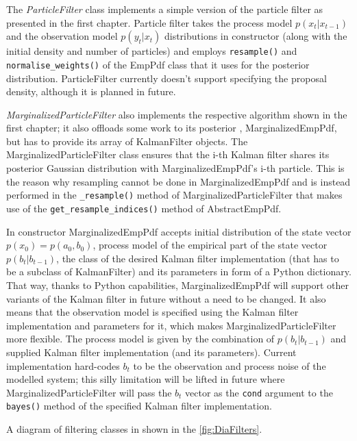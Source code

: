 The \emph{ParticleFilter} class implements a simple version of the particle filter as presented in
the first chapter. Particle filter takes the process model \(p(x_t|x_{t-1})\) and the observation
model \(p(y_t|x_t)\) distributions in constructor (along with the initial density and number of
particles) and employs \verb|resample()| and \verb|normalise_weights()| of the EmpPdf class that it
uses for the posterior distribution. ParticleFilter currently doesn't support specifying the
proposal density, although it is planned in future.

\emph{MarginalizedParticleFilter} also implements the respective algorithm shown in the first
chapter; it also offloads some work to its posterior {\pdf}, MarginalizedEmpPdf, but has to provide its
array of KalmanFilter objects. The MarginalizedParticleFilter class ensures that the i-th Kalman
filter shares its posterior Gaussian distribution with MarginalizedEmpPdf's i-th particle. This is
the reason why resampling cannot be done in MarginalizedEmpPdf and is instead performed in the
\verb|_resample()| method of MarginalizedParticleFilter that makes use of the
\verb|get_resample_indices()| method of AbstractEmpPdf.

In constructor MarginalizedEmpPdf accepts initial distribution of the state vector
\(p(x_0) = p(a_0, b_0)\), process model of the empirical part of the state vector \(p(b_t|b_{t-1})\),
the class of the desired Kalman filter implementation (that has to be a subclass of KalmanFilter)
and its parameters in form of a Python dictionary. That way, thanks to Python capabilities,
MarginalizedEmpPdf will support other variants of the Kalman filter in future without a need to be
changed. It also means that the observation model is specified using the Kalman filter implementation
and parameters for it, which makes MarginalizedParticleFilter more flexible. The process model is
given by the combination of \(p(b_t|b_{t-1})\) and supplied Kalman filter implementation (and its
parameters). Current implementation hard-codes \(b_t\) to be the observation and process noise of
the modelled system; this silly limitation will be lifted in future where MarginalizedParticleFilter
will pass the \(b_t\) vector as the \verb|cond| argument to the \verb|bayes()| method of the
specified Kalman filter implementation.

A diagram of filtering classes in shown in the \autoref{fig:DiaFilters}.

